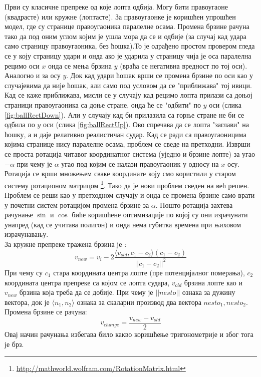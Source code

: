 Први су класичне препреке од које лопта одбија. Могу бити правоугаоне (квадрасте) или кружне (лоптасте).
За правоугаонке је коришћен упрошћен модел, где су странице правоугаоника паралелне осама.
Промена брзине рачуна тако да под оним углом којим је ушла мора да се и одбије (за случај кад удара само страницу правоугаоника, без ћошка).То је одрађено простом провером гледа се у коју страницу удари и онда ако је ударила у страницу чија је оса паралелна рецимо оси $x$ онда се мења брзина $y$ (враћа се негативна вредност по тој оси). Аналогно и за осу $y$.  Док кад удари ћошак врши се промена брзине по оси као у случајевима да није ћошак, али само под условом да се "приближава" тој ивици. Кад се каже приближава, мисли се у случају кад рецимо лопта прилази са доњој страници правоугаоника са доње стране, онда ће се "одбити" по $y$ оси (слика \ref{fig:ballRectDown}). Али у случају кад би прилазила са горње стране не би се одбила по $y$ оси (слика \ref{fig:ballRectUp}).   Ово спречава да се лопта "заглави" на ћошку, а и даје релативно реалистичан судар. Кад се ради са правоугаоницима којима странице нису паралелне осама, проблем се сведе на претходни. Изврши се проста ротација читавог координатног система (уједно и брзине лопте) за угао $-\alpha$ при чему је $\alpha$ угао под којим се налази правоугаоник у односу на $x$ осу. Ротација се врши множењем сваке координате коју смо користили у старом систему ротационом матрицом \footnote{\url{http://mathworld.wolfram.com/RotationMatrix.html}}. Тако да је нови проблем сведен на већ решен. Проблем се реши као у претходном случају и онда се промена брзине само врати у почетни систем ротацијом промена брзине за $\alpha$. Пошто ротација захтева рачунање $\sin$ и $\cos$ биће коришћене оптимизације по којој су они израчунати унапред (кад се учитава полигон) и онда нема губитка времена при њиховом израчунавању.
\\ \indent
За кружне препреке тражена брзина је :
$$v_{new} = v_i - 2 \frac{\langle v_{old}, c_1 - c_2 \rangle (c_1 - c_2)}{||c_1-c_2 ||^2 }$$
При чему су $c_1$ стара координата центра лопте (пре потенцијалног померања), $c_2$ координата центра препреке са којом се лопта судара, $v_{old}$ брзина лопте као и $v_{new}$ брзина која треба да се добије. При чему је $|| nesto||$ ознака за дужину вектора, док је $\langle n_1, n_2 \rangle$ ознака за скаларни производ два вектора $nesto_1, nesto_2$. Промена брзине се рачуна:
$$v_{change} = \frac{v_{new} - v_{old}}{2}$$
Овај начин рачунања избегава било какво коришћење тригонометрије и због тога је брз.
\\ \indent
